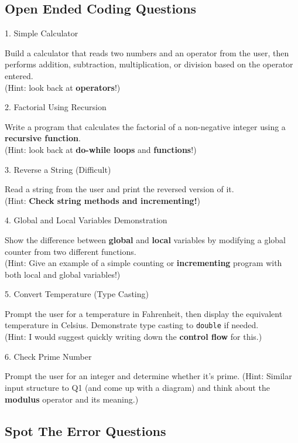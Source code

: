 \documentclass[a4paper,12pt]{article}
\begin{document}
\hrulefill

\newpage

\subsection{Open Ended Coding Questions}

1. Simple Calculator

Build a calculator that reads two numbers and an operator from the user, then performs addition, subtraction, multiplication, or division based on the operator entered.\\
(Hint: look back at \textbf{operators}!)

2. Factorial Using Recursion

Write a program that calculates the factorial of a non-negative integer using a \textbf{recursive function}.\\
(Hint: look back at \textbf{do-while loops} and \textbf{functions}!)

3. Reverse a String (Difficult)

Read a string from the user and print the reversed version of it.\\
(Hint: \textbf{Check string methods and incrementing!})

4. Global and Local Variables Demonstration

Show the difference between \textbf{global} and \textbf{local} variables by modifying a global counter from two different functions.\\
(Hint: Give an example of a simple counting or \textbf{incrementing} program with both local and global variables!)

5. Convert Temperature (Type Casting)

Prompt the user for a temperature in Fahrenheit, then display the equivalent temperature in Celsius. Demonstrate type casting to \verb|double| if needed.\\
(Hint: I would suggest quickly writing down the \textbf{control flow} for this.)

6. Check Prime Number

Prompt the user for an integer and determine whether it’s prime.
(Hint: Similar input structure to Q1 (and come up with a diagram) and think about the \textbf{modulus} operator and its meaning.)

\subsection{Spot The Error Questions}
\end{document}
